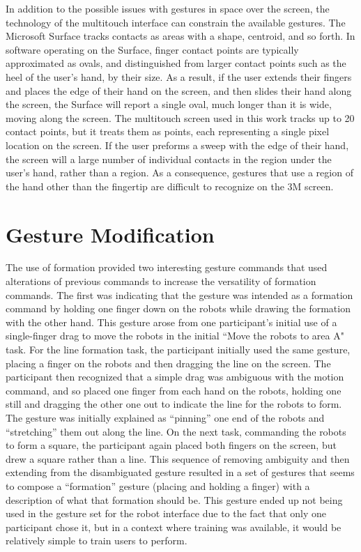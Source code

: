 In addition to the possible issues with gestures in space over the screen, the technology of the multitouch interface can constrain the available gestures. 
The Microsoft Surface tracks contacts as areas with a shape, centroid, and so forth. 
In software operating on the Surface, finger contact points are typically approximated as ovals, and distinguished from larger contact points such as the heel of the user's hand, by their size. 
As a result, if the user extends their fingers and places the edge of their hand on the screen, and then slides their hand along the screen, the Surface will report a single oval, much longer than it is wide, moving along the screen. 
The multitouch screen used in this work tracks up to 20 contact points, but it treats them as points, each representing a single pixel location on the screen. 
If the user preforms a sweep with the edge of their hand, the screen will a large number of individual contacts in the region under the user's hand, rather than a region.
As a consequence, gestures that use a region of the hand other than the fingertip are difficult to recognize on the 3M screen. 

\section{Gesture Modification}

The use of formation provided two interesting gesture commands that used alterations of previous commands to increase the versatility of formation commands. 
The first was indicating that the gesture was intended as a formation command by holding one finger down on the robots while drawing the formation with the other hand. 
This gesture arose from one participant's initial use of a single-finger drag to move the robots in the initial ``Move the robots to area A" task. 
For the line formation task, the participant initially used the same gesture, placing a finger on the robots and then dragging the line on the screen. 
The participant then recognized that a simple drag was ambiguous with the motion command, and so placed one finger from each hand on the robots, holding one still and dragging the other one out to indicate the line for the robots to form. 
The gesture was initially explained as ``pinning'' one end of the robots and ``stretching'' them out along the line.
On the next task, commanding the robots to form a square, the participant again placed both fingers on the screen, but drew a square rather than a line. 
This sequence of removing ambiguity and then extending from the disambiguated gesture resulted in a set of gestures that seems to compose a ``formation'' gesture (placing and holding a finger) with a description of what that formation should be. 
This gesture ended up not being used in the gesture set for the robot interface due to the fact that only one participant chose it, but in a context where training was available, it would be relatively simple to train users to perform. 

